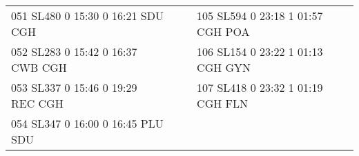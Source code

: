 \begin{scriptsize}
\begin{longtable}{l c c l}
051 SL480  0 15:30 0 16:21 SDU CGH & & & 105 SL594  0 23:18 1 01:57 CGH POA \\

052 SL283  0 15:42 0 16:37 CWB CGH & & & 106 SL154  0 23:22 1 01:13 CGH GYN \\

053 SL337  0 15:46 0 19:29 REC CGH & & & 107 SL418  0 23:32 1 01:19 CGH FLN \\

054 SL347  0 16:00 0 16:45 PLU SDU & & & \\

\end{longtable}

\end{scriptsize}
